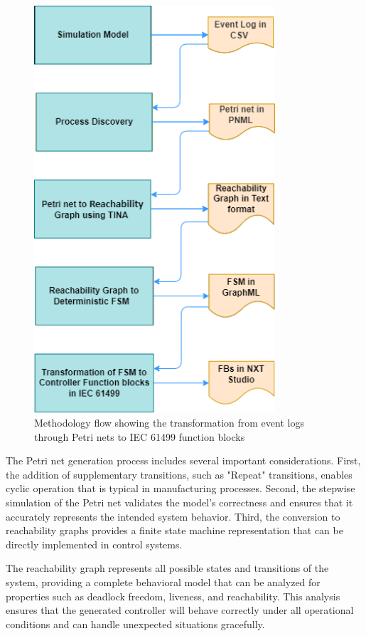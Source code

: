 \begin{figure}[h]
    \centering
    \includegraphics[width=0.8\textwidth]{MX_Papers/Paper6/images/PN2ControllerFlow.png}
    \caption{Methodology flow showing the transformation from event logs through Petri nets to IEC 61499 function blocks}
    \label{fig:methodology_flow}
\end{figure}

The Petri net generation process includes several important considerations. First, the addition of supplementary transitions, such as "Repeat" transitions, enables cyclic operation that is typical in manufacturing processes. Second, the stepwise simulation of the Petri net validates the model's correctness and ensures that it accurately represents the intended system behavior. Third, the conversion to reachability graphs provides a finite state machine representation that can be directly implemented in control systems.

The reachability graph represents all possible states and transitions of the system, providing a complete behavioral model that can be analyzed for properties such as deadlock freedom, liveness, and reachability. This analysis ensures that the generated controller will behave correctly under all operational conditions and can handle unexpected situations gracefully.

